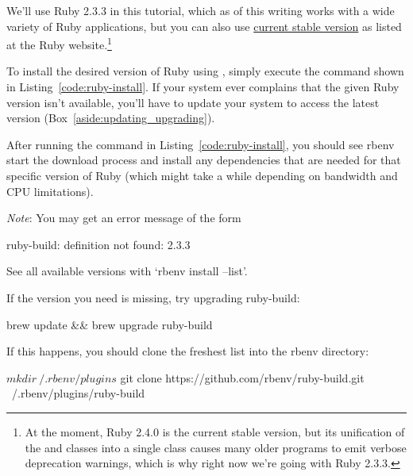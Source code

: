 We'll use Ruby 2.3.3 in this tutorial, which as of this writing works with a wide variety of Ruby applications, but you can also use \href{https://www.ruby-lang.org/en/downloads/}{current stable version} as listed at the Ruby website.\footnote{At the moment, Ruby 2.4.0 is the current stable version, but its unification of the  and  classes into a single  class causes many older programs to emit verbose deprecation warnings, which is why right now we're going with Ruby 2.3.3.}

To install the desired version of Ruby using , simply execute the command shown in Listing~\ref{code:ruby-install}. If your system ever complains that the given Ruby version isn't available, you'll have to update your system to access the latest version (Box~\ref{aside:updating_upgrading}).

\begin{codelisting}
\label{code:ruby-install}
\end{codelisting}

\noindent After running the command in Listing~\ref{code:ruby-install}, you should see rbenv start the download process and install any dependencies that are needed for that specific version of Ruby (which might take a while depending on bandwidth and CPU limitations).

\emph{Note}: You may get an error message of the form

\begin{code}
ruby-build: definition not found: 2.3.3

See all available versions with `rbenv install --list'.

If the version you need is missing, try upgrading ruby-build:

  brew update && brew upgrade ruby-build
\end{code}

\noindent If this happens, you should clone the freshest  list into the rbenv  directory:

\begin{code}
$ mkdir ~/.rbenv/plugins
$ git clone https://github.com/rbenv/ruby-build.git ~/.rbenv/plugins/ruby-build
\end{code}

